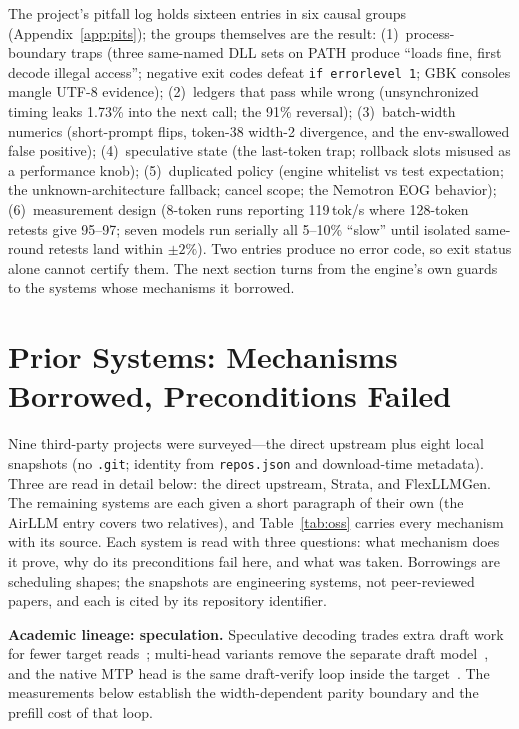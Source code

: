 \documentclass[letterpaper,twocolumn,10pt]{article}
\begin{document}
The project's pitfall log holds sixteen entries in six causal groups
(Appendix~\ref{app:pits}); the groups themselves are the result:
(1)~process-boundary traps (three same-named DLL sets on PATH produce ``loads
fine, first decode illegal access''; negative exit codes defeat
\texttt{if errorlevel 1}; GBK consoles mangle UTF-8 evidence);
(2)~ledgers that pass while wrong (unsynchronized timing leaks 1.73\% into the
next call; the 91\% reversal);
(3)~batch-width numerics (short-prompt flips, token-38 width-2 divergence, and
the env-swallowed false positive);
(4)~speculative state (the last-token trap; rollback slots misused as a
performance knob);
(5)~duplicated policy (engine whitelist vs test expectation; the
unknown-architecture fallback; cancel scope; the Nemotron EOG behavior);
(6)~measurement design (8-token runs reporting 119\,tok/s where 128-token
retests give 95--97; seven models run serially all 5--10\% ``slow'' until
isolated same-round retests land within $\pm2\%$).
Two entries produce no error code, so exit status alone cannot certify them.
The next section turns from the engine's own guards to the systems whose
mechanisms it borrowed.

\section{Prior Systems: Mechanisms Borrowed, Preconditions Failed}

Nine third-party projects were surveyed---the direct upstream plus eight
local snapshots (no \texttt{.git}; identity from \texttt{repos.json} and
download-time metadata). Three are read in detail below: the direct upstream,
Strata, and FlexLLMGen. The remaining systems are each given a short paragraph
of their own (the AirLLM entry covers two relatives), and Table~\ref{tab:oss}
carries every mechanism with its source. Each system is read with three
questions: what
mechanism does it prove, why do its preconditions fail here, and what was taken.
Borrowings are scheduling shapes; the snapshots are engineering systems, not
peer-reviewed papers, and each is cited by its repository identifier.

\textbf{Academic lineage: speculation.} Speculative decoding trades extra
draft work for fewer target reads~\cite{leviathan2023,chen2023spec};
multi-head variants remove the separate draft model~\cite{medusa2024}, and the
native MTP head is the same draft-verify loop inside the
target~\cite{deepseekv3,llamacppmtp}. The measurements below establish the
width-dependent parity boundary and the prefill cost of that loop.
\end{document}
